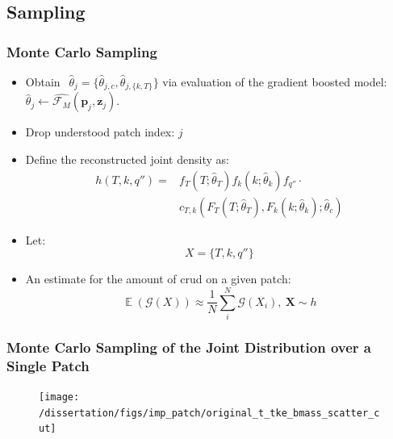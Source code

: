 \documentclass[t, pdftex]{beamer}
\DeclareMathOperator*{\E}{\mathbb{E}}
\begin{document}
\subsection*{Sampling}
\begin{frame}
\frametitle{Monte Carlo Sampling}
\vspace{-16pt}
\begin{itemize}
    \item Obtain $\ \ \hat \theta_j = \{\hat \theta_{j,c}, \hat \theta_{j,\{k, T\}} \}$ via evaluation of the gradient boosted model: $\hat \theta_j \leftarrow \hat{\mathcal F_M}(\mathbf p_j, \mathbf z_j)$.
    \item Drop understood patch index: $j$ 
    \item Define the reconstructed joint density as:
\begin{align}
h(T, k, q'') = & f_T(T;\hat \theta_T) f_k(k;\hat \theta_k) f_{q''} \cdot \nonumber \\
& c_{T,k}(F_T(T;\hat \theta_{T}),F_k(k;\hat \theta_{k});\hat \theta_c) \nonumber
\label{eq:joint_t_tke_q}
\end{align} 

\item Let:
\[ X=\{T, k, q''\} \]

\item An estimate for the amount of crud on a given patch:
\begin{equation}
\E(\mathcal G(X)) \approx \frac{1}{N} \sum_i^N \mathcal G(X_i), \ \mathbf{X} \sim {h} \nonumber
\label{eq:mc_expected_crud}
\end{equation}
\end{itemize}
\end{frame}

\begin{frame}
\frametitle{\small Monte Carlo Sampling of the Joint Distribution over a Single Patch}
\vspace{-16pt}
\begin{figure}[!htbp]
    \centering
    \texttt{[image: /dissertation/figs/imp\_patch/original\_t\_tke\_bmass\_scatter\_cut]}
    \label{model_overview}
\end{figure}
\end{frame}
\end{document}
